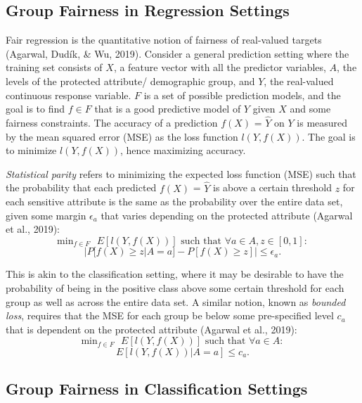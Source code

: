 \documentclass[12pt, twoside]{amherstthesis}
\begin{document}
\hypertarget{group-fairness-in-regression-settings}{%
\subsection{Group Fairness in Regression Settings}\label{group-fairness-in-regression-settings}}

Fair regression is the quantitative notion of fairness of real-valued targets (Agarwal, Dudík, \& Wu, 2019). Consider a general prediction setting where the training set consists of \(X\), a feature vector with all the predictor variables, \(A\), the levels of the protected attribute/ demographic group, and \(Y\), the real-valued continuous response variable. \(F\) is a set of possible prediction models, and the goal is to find \(f \in F\) that is a good predictive model of \(Y\) given \(X\) and some fairness constraints. The accuracy of a prediction \(f(X)\) = \(\hat{Y}\) on \(Y\) is measured by the mean squared error (MSE) as the loss function \(l(Y, f(X))\). The goal is to minimize \(l(Y, f(X))\), hence maximizing accuracy.

\emph{Statistical parity} refers to minimizing the expected loss function (MSE) such that the probability that each predicted \(f(X)\) = \(\hat{Y}\) is above a certain threshold \(z\) for each sensitive attribute is the same as the probability over the entire data set, given some margin \(\epsilon_a\) that varies depending on the protected attribute (Agarwal et al., 2019):
\begin{equation}
\label{ch1eq1}
\text{min}_{f \in F} \text{ } E[l(Y, f(X))] \text{ such that } \forall a \in A, z \in [0,1]:
\end{equation}
\[ |P[f(X) \geq z | A = a] - P[f(X) \geq z]| \leq \epsilon_a.\]

This is akin to the classification setting, where it may be desirable to have the probability of being in the positive class above some certain threshold for each group as well as across the entire data set. A similar notion, known as \emph{bounded loss}, requires that the MSE for each group be below some pre-specified level \(c_a\) that is dependent on the protected attribute (Agarwal et al., 2019):
\begin{equation}
\label{ch1eq2}
\text{min}_{f \in F} \text{ } E[l(Y, f(X))] \text{ such that } \forall a \in A: 
\end{equation}
\[ E[l(Y, f(X)) | A = a] \leq c_a.\]

\hypertarget{classfairdef}{%
\subsection{Group Fairness in Classification Settings}\label{classfairdef}}
\end{document}
